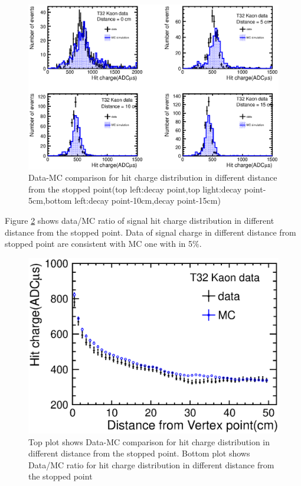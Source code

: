 \begin{figure}[!htb]
  \begin{center}
    \includegraphics[width=0.8\hsize]{fig/RangeVsHit4_wcut_hough.eps}
  \end{center}
  \caption{Data-MC comparison for hit charge distribution in different distance from the stopped point(top left:decay point,top light:decay point-5cm,bottom left:decay point-10cm,decay point-15cm)}
  \label{RangeVsHit_hough}
\end{figure}

Figure \ref{RangeVsHitRatio_hough} shows data/MC ratio of signal hit charge distribution in different distance from the stopped point.
Data of signal charge in different distance from stopped point are consistent with MC one with in 5$\%$.

\begin{figure}[htb]
  \begin{center}
    \includegraphics[width=1.0\hsize]{fig/RangeVsHitfabs_wcut_hough.eps}
  \end{center}
  \caption{Top plot shows Data-MC comparison for hit charge distribution in different distance from the stopped point.
    Bottom plot shows Data/MC ratio for hit charge distribution in different distance from the stopped point}
  \label{RangeVsHitfabs_hough}
  \label{RangeVsHitRatio_hough}
\end{figure}



